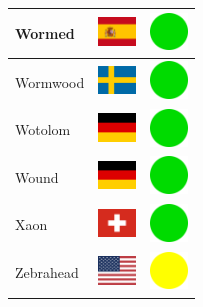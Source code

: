 \documentclass[12pt, a4paper, twoside]{report}
\begin{document}
\begin{center}
\begin{longtable}{|p{5cm}|p{2cm}|p{2cm}|}
 Wormed                                                     & \includegraphics[width=1cm]{../4x3/es} &   \includegraphics[width=1cm]{../likes/y} \\ \hline
 Wormwood                                                   & \includegraphics[width=1cm]{../4x3/se} &   \includegraphics[width=1cm]{../likes/y} \\ \hline
 Wotolom                                                    & \includegraphics[width=1cm]{../4x3/de} &   \includegraphics[width=1cm]{../likes/y} \\ \hline
 Wound                                                      & \includegraphics[width=1cm]{../4x3/de} &   \includegraphics[width=1cm]{../likes/y} \\ \hline
 Xaon                                                       & \includegraphics[width=1cm]{../4x3/ch} &   \includegraphics[width=1cm]{../likes/y} \\ \hline
 Zebrahead                                                  & \includegraphics[width=1cm]{../4x3/us} &   \includegraphics[width=1cm]{../likes/m} \\ \hline

\end{longtable}
\end{center}
\end{document}
